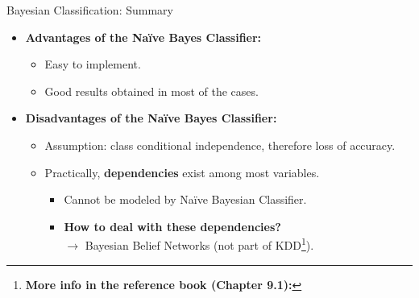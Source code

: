 \begin{frame}{Bayesian Classification: Summary}
	\begin{itemize}
		\item \textbf{Advantages of the Naïve Bayes Classifier:}
		      \begin{itemize}
			      \item Easy to implement.
			      \item Good results obtained in most of the cases.
		      \end{itemize}
		\item \textbf{Disadvantages of the Naïve Bayes Classifier:}
		      \begin{itemize}
			      \item Assumption: class conditional independence, therefore loss of accuracy.
			      \item Practically, \textbf{dependencies} exist among most variables.
			            \begin{itemize}
				            \item Cannot be modeled by Naïve Bayesian Classifier.
				            \item \textbf{\color{airforceblue}How to deal with these dependencies?} \\ $\rightarrow$ Bayesian Belief Networks (not part of KDD\footnote{\textbf{More info in the reference book (Chapter 9.1):} }).
			            \end{itemize}
		      \end{itemize}
	\end{itemize}
\end{frame}
